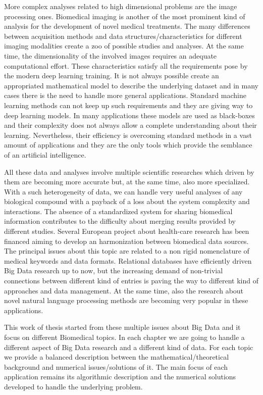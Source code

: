 \documentclass{standalone}
\begin{document}
More complex analyses related to high dimensional problems are the image processing ones.
Biomedical imaging is another of the most prominent kind of analysis for the development of novel medical treatments.
The many differences between acquisition methods and data structures/characteristics for different imaging modalities create a zoo of possible studies and analyses.
At the same time, the dimensionality of the involved images requires an adequate computational effort.
These characteristics satisfy all the requirements pose by the modern deep learning training.
It is not always possible create an appropriated mathematical model to describe the underlying dataset and in many cases there is the need to handle more general applications.
Standard machine learning methods can not keep up such requirements and they are giving way to deep learning models.
In many applications these models are used as black-boxes and their complexity does not always allow a complete understanding about their learning.
Nevertheless, their efficiency is overcoming standard methods in a vast amount of applications and they are the only tools which provide the semblance of an artificial intelligence.

All these data and analyses involve multiple scientific researches which driven by them are becoming more accurate but, at the same time, also more specialized.
With a such heterogeneity of data, we can handle very useful analyses of any biological compound with a payback of a loss about the system complexity and interactions.
The absence of a standardized system for sharing biomedical information contributes to the difficulty about merging results provided by different studies.
Several European project about health-care research has been financed aiming to develop an harmonization between biomedical data sources.
The principal issues about this topic are related to a non rigid nomenclature of medical keywords and data formats.
Relational databases have efficiently driven Big Data research up to now, but the increasing demand of non-trivial connections between different kind of entries is paving the way to different kind of approaches and data management.
At the same time, also the research about novel natural language processing methods are becoming very popular in these applications.

This work of thesis started from these multiple issues about Big Data and it focus on different Biomedical topics.
In each chapter we are going to handle a different aspect of Big Data research and a different kind of data.
For each topic we provide a balanced description between the mathematical/theoretical background and numerical issues/solutions of it.
The main focus of each application remains its algorithmic description and the numerical solutions developed to handle the underlying problem.
\end{document}

